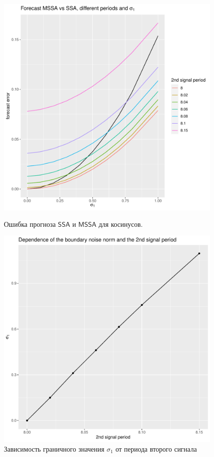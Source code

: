 \documentclass[specialist, substylefile = spbureport.rtx,
    subf,href,colorlinks=true, 12pt]{disser}
\newcommand{\SSA}{\mathsf{SSA}}
\newcommand{\MSSA}{\mathsf{MSSA}}
\begin{document}
        \begin{figure}[h]
            \centering
            \begin{minipage}{.45\textwidth}
                \centering
                \includegraphics[width=\textwidth]{experiment_2_cos1.pdf}
                \caption{Ошибка прогноза $\SSA$ и $\MSSA$ для косинусов.}
                \label{fig:exp2_cos1}
            \end{minipage}\hfill
            \begin{minipage}{.45\textwidth}
                \centering
            \includegraphics[width=\textwidth]{experiment_2_cos2.pdf}
            \caption{Зависимость граничного значения $\sigma_1$ от периода второго сигнала}
            \label{fig:exp2_cos2}
            \end{minipage}
        \end{figure}
\end{document}
